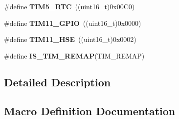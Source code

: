 \begin{DoxyCompactItemize}
\item 
\hypertarget{group___t_i_m___remap_gad95bd2157c29f94703c0942ca3d2b767}{}\#define {\bfseries T\+I\+M5\+\_\+\+R\+T\+C}~((uint16\+\_\+t)0x00\+C0)\label{group___t_i_m___remap_gad95bd2157c29f94703c0942ca3d2b767}

\item 
\hypertarget{group___t_i_m___remap_ga96850a4ae7ae9590f1ab9c04ec32bb06}{}\#define {\bfseries T\+I\+M11\+\_\+\+G\+P\+I\+O}~((uint16\+\_\+t)0x0000)\label{group___t_i_m___remap_ga96850a4ae7ae9590f1ab9c04ec32bb06}

\item 
\hypertarget{group___t_i_m___remap_ga1d6d3f53290050b59b202e6d72af673a}{}\#define {\bfseries T\+I\+M11\+\_\+\+H\+S\+E}~((uint16\+\_\+t)0x0002)\label{group___t_i_m___remap_ga1d6d3f53290050b59b202e6d72af673a}

\item 
\#define {\bfseries I\+S\+\_\+\+T\+I\+M\+\_\+\+R\+E\+M\+A\+P}(T\+I\+M\+\_\+\+R\+E\+M\+A\+P)
\end{DoxyCompactItemize}


\subsection{Detailed Description}


\subsection{Macro Definition Documentation}
\hypertarget{group___t_i_m___remap_ga7faab73212e996d8b49555d3ad5be965}{}
